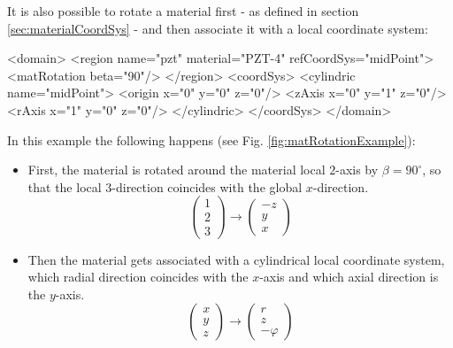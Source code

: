 It is also possible to rotate a material first - as defined in section
\ref{sec:materialCoordSys} - and then associate it with a local coordinate
system:
\begin{xmllisting}
  <domain>
    <region name="pzt" material="PZT-4" refCoordSys="midPoint">
      <matRotation beta="90"/>
    </region>
    <coordSys>
     <cylindric name="midPoint"> 
        <origin x="0" y="0" z="0"/>
        <zAxis  x="0" y="1" z="0"/>
        <rAxis  x="1" y="0" z="0"/>
      </cylindric>
    </coordSys>
  </domain>
\end{xmllisting}
In this example the following happens (see Fig. \ref{fig:matRotationExample}):
\begin{itemize}
 \item First, the material is rotated around the material local $2$-axis by
$\beta=90^\circ$, so that the local $3$-direction coincides with the global
$x$-direction.
\begin{equation}
\left( 
\begin{array}{c}
  1 \\ 2 \\ 3 
 \end{array}
\right)
\rightarrow
\left(
\begin{array}{c}
  -z \\ y \\ x 
 \end{array}
\right)
\end{equation}
\item Then the material gets associated with a cylindrical local coordinate
system, which radial direction coincides with the $x$-axis and which axial
direction is the $y$-axis.
\begin{equation}
\left( 
\begin{array}{c}
  x \\ y \\ z 
 \end{array}
\right)
\rightarrow
\left(
\begin{array}{c}
  r \\ z \\ -\varphi 
 \end{array}
\right)
\end{equation}

\end{itemize}

